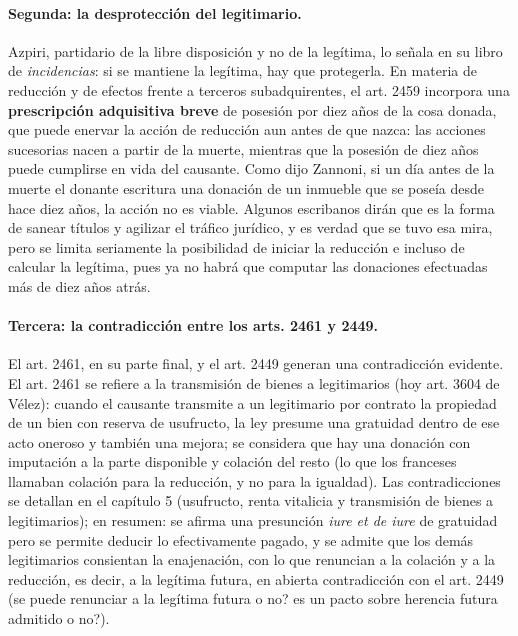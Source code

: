 \documentclass[12pt,oneside]{book}
\begin{document}
\paragraph{Segunda: la desprotección del legitimario.} Azpiri, partidario de la libre disposición y no de la legítima, lo señala en su libro de \textit{incidencias}: si se mantiene la legítima, hay que protegerla. En materia de reducción y de efectos frente a terceros subadquirentes, el art. 2459 incorpora una \textbf{prescripción adquisitiva breve} de posesión por diez años de la cosa donada, que puede enervar la acción de reducción aun antes de que nazca: las acciones sucesorias nacen a partir de la muerte, mientras que la posesión de diez años puede cumplirse en vida del causante. Como dijo Zannoni, si un día antes de la muerte el donante escritura una donación de un inmueble que se poseía desde hace diez años, la acción no es viable. Algunos escribanos dirán que es la forma de sanear títulos y agilizar el tráfico jurídico, y es verdad que se tuvo esa mira, pero se limita seriamente la posibilidad de iniciar la reducción e incluso de calcular la legítima, pues ya no habrá que computar las donaciones efectuadas más de diez años atrás.

\paragraph{Tercera: la contradicción entre los arts. 2461 y 2449.} El art. 2461, en su parte final, y el art. 2449 generan una contradicción evidente. El art. 2461 se refiere a la transmisión de bienes a legitimarios (hoy art. 3604 de Vélez): cuando el causante transmite a un legitimario por contrato la propiedad de un bien con reserva de usufructo, la ley presume una gratuidad dentro de ese acto oneroso y también una mejora; se considera que hay una donación con imputación a la parte disponible y colación del resto (lo que los franceses llamaban colación para la reducción, y no para la igualdad). Las contradicciones se detallan en el capítulo 5 (usufructo, renta vitalicia y transmisión de bienes a legitimarios); en resumen: se afirma una presunción \textit{iure et de iure} de gratuidad pero se permite deducir lo efectivamente pagado, y se admite que los demás legitimarios consientan la enajenación, con lo que renuncian a la colación y a la reducción, es decir, a la legítima futura, en abierta contradicción con el art. 2449 (\textquestiondown{}se puede renunciar a la legítima futura o no? \textquestiondown{}es un pacto sobre herencia futura admitido o no?).
\end{document}
